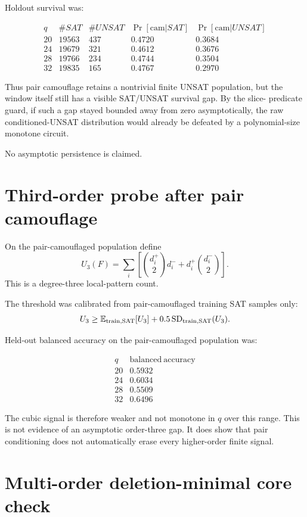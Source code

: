 \documentclass[11pt]{article}
\begin{document}
Holdout survival was:

\[
\begin{array}{c|cc|cc}
q&\#SAT&\#UNSAT&\Pr[\mathrm{cam}|SAT]&\Pr[\mathrm{cam}|UNSAT]\\
\hline
20&19563&437&0.4720&0.3684\\
24&19679&321&0.4612&0.3676\\
28&19766&234&0.4744&0.3504\\
32&19835&165&0.4767&0.2970
\end{array}
\]

Thus pair camouflage retains a nontrivial finite UNSAT population, but the
window itself still has a visible SAT/UNSAT survival gap.  By the slice-
predicate guard, if such a gap stayed bounded away from zero asymptotically,
the raw conditioned-UNSAT distribution would already be defeated by a
polynomial-size monotone circuit.

No asymptotic persistence is claimed.

\section{Third-order probe after pair camouflage}

On the pair-camouflaged population define
\[
U_3(F)=
\sum_i\left[
\binom{d_i^+}{2}d_i^-+
d_i^+\binom{d_i^-}{2}
\right].
\]
This is a degree-three local-pattern count.

The threshold was calibrated from pair-camouflaged training SAT samples only:
\[
U_3\ge
\mathbb E_{\rm train,SAT}[U_3]
+
0.5\,\mathrm{SD}_{\rm train,SAT}(U_3).
\]

Held-out balanced accuracy on the pair-camouflaged population was:

\[
\begin{array}{c|c}
q&\mathrm{balanced\ accuracy}\\
\hline
20&0.5932\\
24&0.6034\\
28&0.5509\\
32&0.6496
\end{array}
\]

The cubic signal is therefore weaker and not monotone in $q$ over this range.
This is not evidence of an asymptotic order-three gap.  It does show that pair
conditioning does not automatically erase every higher-order finite signal.

\section{Multi-order deletion-minimal core check}
\end{document}
